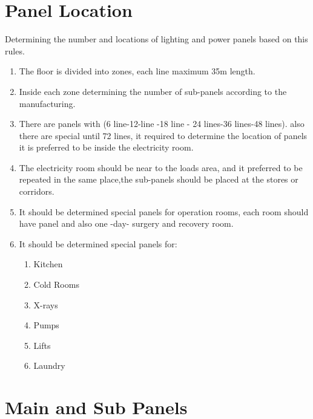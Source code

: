 \documentclass[12pt,fleqn]{book} %
\begin{document}
\section {Panel Location}
Determining the number and locations of lighting and power panels based on this rules.
\begin{enumerate}
    \item The floor is divided into zones, each line maximum 35m length.
    \item Inside each zone determining the number of sub-panels according to the
manufacturing.
    \item There are panels with (6 line-12-line -18 line - 24 lines-36 lines-48 lines). also there are special until 72 lines, it required to determine the location of panels it is preferred to be inside the electricity room.
    \item The electricity room should be near to the loads area, and it preferred to be repeated in the same place,the sub-panels should be placed at the stores or corridors.
    \item It should be determined special panels for operation rooms, each room should have panel and also one -day- surgery and recovery room.
    \item It should be determined special panels for:
    \begin{enumerate}
        \item Kitchen
        \item Cold Rooms
        \item X-rays
        \item Pumps
        \item Lifts
        \item Laundry
    \end{enumerate}
\end{enumerate}
\section {Main and Sub Panels}
\end{document}
